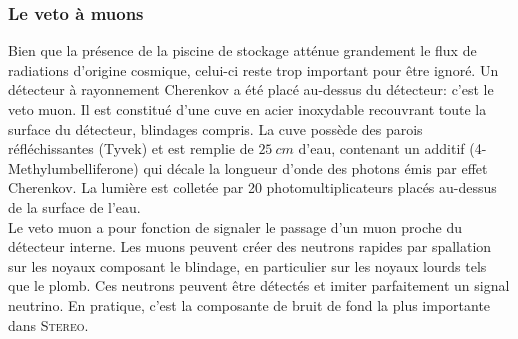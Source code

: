 \subsubsection*{Le veto à muons} 

Bien que la présence de la piscine de stockage atténue grandement le flux de radiations d'origine cosmique, celui-ci reste trop important pour être ignoré. Un détecteur à rayonnement Cherenkov a été placé au-dessus du détecteur: c'est le veto muon. Il est constitué d'une cuve en acier inoxydable recouvrant toute la surface du détecteur, blindages compris. La cuve possède des parois réfléchissantes (Tyvek) et est remplie de $\SI{25}{cm}$ d'eau, contenant un additif (4- Methylumbelliferone) qui décale la longueur d'onde des photons émis par effet Cherenkov. La lumière est colletée par 20 photomultiplicateurs placés au-dessus de la surface de l'eau.\\ 

Le veto muon a pour fonction de signaler le passage d'un muon proche du détecteur interne. Les muons peuvent créer des neutrons rapides par spallation sur les noyaux composant le blindage, en particulier sur les noyaux lourds tels que le plomb. Ces neutrons peuvent être détectés et imiter parfaitement un signal neutrino. En pratique, c'est la composante de bruit de fond la plus importante dans \textsc{Stereo}.\\ 

% 








